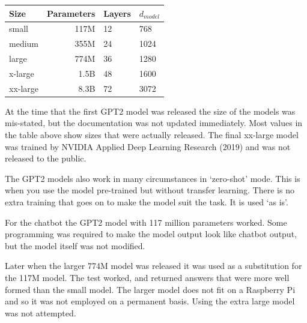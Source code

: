 \begin{center}

\begin{tabular}{lrll}
	Size & Parameters & Layers & $d_{model}$ \\
	\hline
	small & 117M       & 12     & 768          \\
	medium & 355M       & 24     & 1024         \\
	large & 774M       & 36     & 1280         \\
	x-large & 1.5B     & 48     & 1600 \\
	xx-large & 8.3B   &  72 &   3072 
\end{tabular}

	
\end{center}

At the time that the first GPT2 model was released the size of the models was mis-stated, but the documentation was not updated immediately. Most values in the table above show sizes that were actually released. The final xx-large model was trained by NVIDIA Applied Deep Learning Research (2019)\cite{2019NVIDIAadlr} and was not released to the public.

The GPT2 models also work in many circumstances in `zero-shot' mode. This is when you use the model pre-trained but without transfer learning. There is no extra training that goes on to make the model suit the task. It is used `as is'.

For the chatbot the GPT2 model with 117 million parameters worked. Some programming was required to make the model output look like chatbot output, but the model itself was not modified.

Later when the larger 774M model was released it was used as a substitution for the 117M model. The test worked, and returned answers that were more well formed than the small model. The larger model does not fit on a Raspberry Pi and so it was not employed on a permanent basis. Using the extra large model was not attempted.